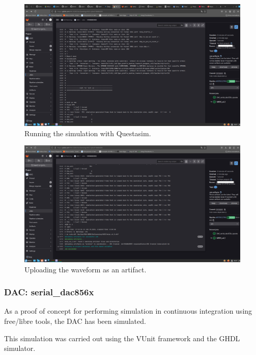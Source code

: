 \begin{figure}[H]
\centering
\includegraphics[width=14cm]{figures/wrpc_ci_2.png}
\caption{Running the simulation with Questasim.}
\label{fig:wrpc-ci-2}
\end{figure}

\begin{figure}[H]
\centering
\includegraphics[width=14cm]{figures/wrpc_ci_3.png}
\caption{Uploading the waveform as an artifact.}
\label{fig:wrpc-ci-3}
\end{figure}

\subsubsection{DAC: serial\_dac856x}

\noindent As a proof of concept for performing simulation in continuous integration using free/libre tools, the  DAC has been simulated.

\vspace{5mm}

\noindent This simulation was carried out using the VUnit \cite{gh:vunit} framework and the GHDL \cite{gh:ghdl} simulator.

